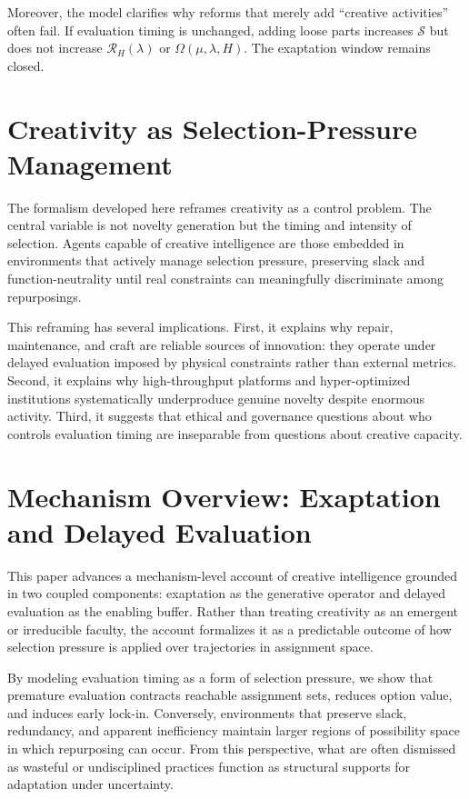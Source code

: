 \documentclass[11pt]{article}
\theoremstyle{definition}
\begin{document}
Moreover, the model clarifies why reforms that merely add ``creative activities'' often fail. If evaluation timing is unchanged, adding loose parts increases $\mathcal{S}$ but does not increase $\mathcal{R}_H(\lambda)$ or $\Omega(\mu,\lambda,H)$. The exaptation window remains closed.

\section{Creativity as Selection-Pressure Management}

The formalism developed here reframes creativity as a control problem. The central variable is not novelty generation but the timing and intensity of selection. Agents capable of creative intelligence are those embedded in environments that actively manage selection pressure, preserving slack and function-neutrality until real constraints can meaningfully discriminate among repurposings.

This reframing has several implications. First, it explains why repair, maintenance, and craft are reliable sources of innovation: they operate under delayed evaluation imposed by physical constraints rather than external metrics. Second, it explains why high-throughput platforms and hyper-optimized institutions systematically underproduce genuine novelty despite enormous activity. Third, it suggests that ethical and governance questions about who controls evaluation timing are inseparable from questions about creative capacity.

\section{Mechanism Overview: Exaptation and Delayed Evaluation}

This paper advances a mechanism-level account of creative intelligence grounded in two coupled components: exaptation as the generative operator and delayed evaluation as the enabling buffer. Rather than treating creativity as an emergent or irreducible faculty, the account formalizes it as a predictable outcome of how selection pressure is applied over trajectories in assignment space.

By modeling evaluation timing as a form of selection pressure, we show that premature evaluation contracts reachable assignment sets, reduces option value, and induces early lock-in. Conversely, environments that preserve slack, redundancy, and apparent inefficiency maintain larger regions of possibility space in which repurposing can occur. From this perspective, what are often dismissed as wasteful or undisciplined practices function as structural supports for adaptation under uncertainty.
\end{document}

